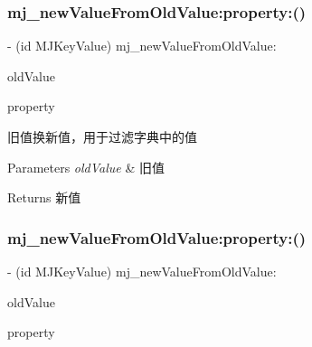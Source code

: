 \subsubsection{\texorpdfstring{mj\+\_\+new\+Value\+From\+Old\+Value\+:property\+:()}{mj\_newValueFromOldValue:property:()}\hspace{0.1cm}{\footnotesize\ttfamily [1/3]}}
{\footnotesize\ttfamily -\/ (id M\+J\+Key\+Value) mj\+\_\+new\+Value\+From\+Old\+Value\+: \begin{DoxyParamCaption}\item[{(id)}]{old\+Value }\item[{property:(\mbox{\hyperlink{interface_m_j_property}{M\+J\+Property}} $\ast$)}]{property }\end{DoxyParamCaption}\hspace{0.3cm}{\ttfamily [optional]}}

旧值换新值，用于过滤字典中的值


\begin{DoxyParams}{Parameters}
{\em old\+Value} & 旧值\\
\hline
\end{DoxyParams}
\begin{DoxyReturn}{Returns}
新值 
\end{DoxyReturn}
\mbox{\label{protocol_m_j_key_value_01-p_a6a4f763701529e800607aad6d51f680a}} 
\subsubsection{\texorpdfstring{mj\+\_\+new\+Value\+From\+Old\+Value\+:property\+:()}{mj\_newValueFromOldValue:property:()}\hspace{0.1cm}{\footnotesize\ttfamily [2/3]}}
{\footnotesize\ttfamily -\/ (id M\+J\+Key\+Value) mj\+\_\+new\+Value\+From\+Old\+Value\+: \begin{DoxyParamCaption}\item[{(id)}]{old\+Value }\item[{property:(\mbox{\hyperlink{interface_m_j_property}{M\+J\+Property}} $\ast$)}]{property }\end{DoxyParamCaption}\hspace{0.3cm}{\ttfamily [optional]}}

